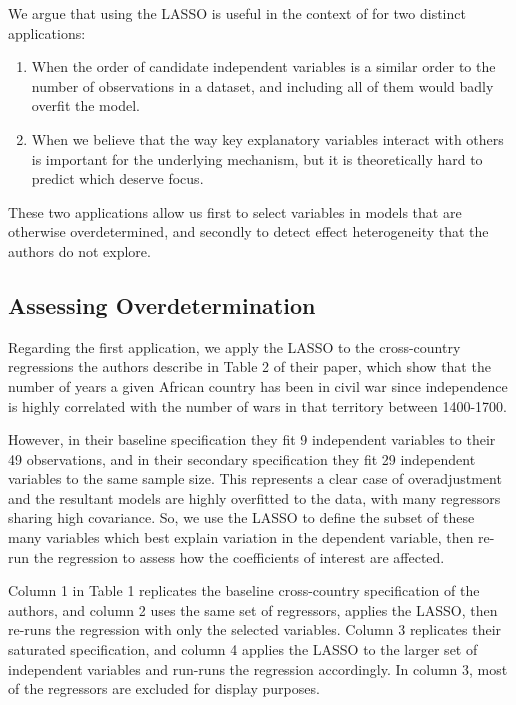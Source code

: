We argue that using the LASSO is useful in the context of \citet{BesleyRQ2014} for two distinct applications:
\begin{enumerate}
	\item When the order of candidate independent variables is a similar order to the number of observations in a dataset, and including all of them would badly overfit the model.
	\item When we believe that the way key explanatory variables interact with others is important for the underlying mechanism, but it is theoretically hard to predict which deserve focus. 
\end{enumerate}

These two applications allow us first to select variables in models that are otherwise overdetermined, and secondly to detect effect heterogeneity that the authors do not explore.

\subsection{Assessing Overdetermination}

Regarding the first application, we apply the LASSO to the cross-country regressions the authors describe in Table 2 of their paper, which show that the number of years a given African country has been in civil war since independence is highly correlated with the number of wars in that territory between 1400-1700. 

However, in their baseline specification they fit 9 independent variables to their 49 observations, and in their secondary specification they fit 29 independent variables to the same sample size. This represents a clear case of overadjustment \citep{SchistermanColePlatt2009} and the resultant models are highly overfitted to the data, with many regressors sharing high covariance. So, we use the LASSO to define the subset of these many variables which best explain variation in the dependent variable, then re-run the regression to assess how the coefficients of interest are affected. 

Column 1 in Table 1 replicates the baseline cross-country specification of the authors, and column 2 uses the same set of regressors, applies the LASSO, then re-runs the regression with only the selected variables. Column 3 replicates their saturated specification, and column 4 applies the LASSO to the larger set of independent variables and run-runs the regression accordingly. In column 3, most of the regressors are excluded for display purposes.

